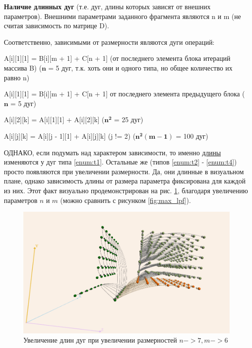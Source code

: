 \documentclass[12pt, fleqn]{article}
\theoremstyle{definition}
\newenvironment{packed_enum}{
\begin{enumerate}
  \setlength{\itemsep}{1pt}
  \setlength{\parskip}{0pt}
  \setlength{\parsep}{0pt}
}{\end{enumerate}}
\begin{document}
\begin{packed_enum}
 \item \textbf{Наличие длинных дуг} (т.е. дуг, длины которых зависят от внешних параметров). Внешними параметрами заданного фрагмента являются n и m (не считая зависимость по матрице D).
 
 Соответственно, зависимыми от размерности являются дуги операций:
 \begin{packed_enum}
  \item \label{enum:t1} A[i][1][1] = B[i][m + 1] + C[n + 1] (от последнего элемента блока итераций массива B) ($\mathbf{n}$ = 5 дуг, т.к. хоть они и одного типа, но общее количество их равно n)
  \item \label{enum:t2} A[i][1][1] = B[i][m + 1] + C[n + 1] от последнего элемента предыдущего блока ($\mathbf{n}$ = 5 дуг)
  \item \label{enum:t3} A[i][2][k] = A[i][1][1] + A[i][2][k] ($\mathbf{n^2}$ = 25 дуг)
  \item \label{enum:t4} A[i][j][k] = A[i][j - 1][1] + A[i][j][k] (j != 2) ($\mathbf{n^2 (m - 1)}$ = 100 дуг)
 \end{packed_enum}
 
ОДНАКО, если подумать над характером зависимости, то именно \underline{длины} изменяются у дуг типа \ref{enum:t1}. Остальные же (типов \ref{enum:t2} - \ref{enum:t4}) просто появляются при увеличении размерности. Да, они длинные в визуальном плане, однако зависимость длины от размера параметра фиксирована для каждой из них. Этот факт визуально продемонстрирован на рис. \ref{fig:length}, благодаря увеличению параметров $n$ и $m$ (можно сравнить с рисунком \ref{fig:max_lpf}).
 \begin{figure}[ht]
\begin{center}
 \includegraphics[scale=0.96]{lengths.png}
 \caption{Увеличение длин дуг при увеличении размерностей $n->7, m->6$}
 \label{fig:length}
\end{center}
\end{figure}


\end{packed_enum}
\end{document}
